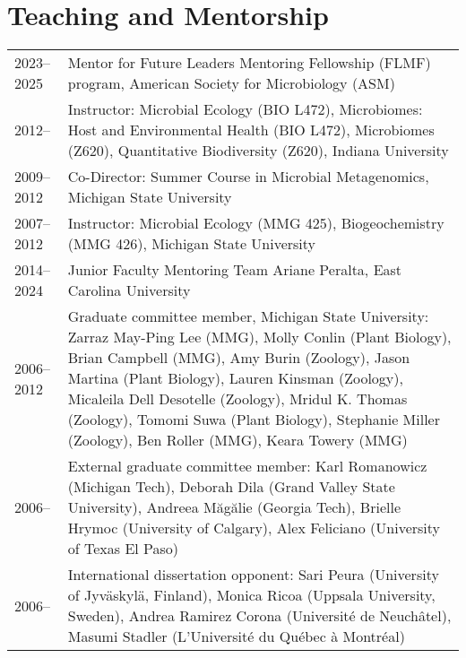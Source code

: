 \documentclass[11pt]{article}
\begin{document}
\section*{Teaching and Mentorship}
\vspace{-0.5em}
\begin{longtable}{@{}p{4em}@{\hspace{2em}}p{}@{}}
2023--2025 & Mentor for Future Leaders Mentoring Fellowship (FLMF) program, American Society for Microbiology (ASM) \\
2012--     & Instructor: Microbial Ecology (BIO L472), Microbiomes: Host and Environmental Health (BIO L472), Microbiomes (Z620), Quantitative Biodiversity (Z620), Indiana University \\
2009--2012 & Co-Director: Summer Course in Microbial Metagenomics, Michigan State University \\
2007--2012 & Instructor: Microbial Ecology (MMG 425), Biogeochemistry (MMG 426), Michigan State University \\

2014--2024 & Junior Faculty Mentoring Team Ariane Peralta, East Carolina University \\

2006--2012 & Graduate committee member, Michigan State University: Zarraz May-Ping Lee (MMG), Molly Conlin (Plant Biology), Brian Campbell (MMG), Amy Burin (Zoology), Jason Martina (Plant Biology), Lauren Kinsman (Zoology), Micaleila Dell Desotelle (Zoology), Mridul K. Thomas (Zoology), Tomomi Suwa (Plant Biology), Stephanie Miller (Zoology), Ben Roller (MMG), Keara Towery (MMG)\\

2006-- & External graduate committee member: Karl Romanowicz (Michigan Tech), Deborah Dila (Grand Valley State University), Andreea Măgălie (Georgia Tech), Brielle Hrymoc (University of Calgary), Alex Feliciano (University of Texas El Paso)\\ 

2006-- & International dissertation opponent: Sari Peura (University of Jyväskylä, Finland), Monica Ricoa (Uppsala University, Sweden), Andrea Ramirez Corona (Université de Neuchâtel), Masumi Stadler (L'Université du Québec à Montréal) \\


\end{longtable}
\end{document}
